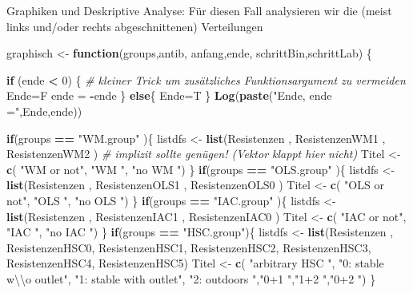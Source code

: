 \documentclass[
]{article}
\newenvironment{Shaded}{\begin{snugshade}}{\end{snugshade}}
\newcommand{\CharTok}[1]{\textcolor[rgb]{0.31,0.60,0.02}{#1}}
\newcommand{\CommentTok}[1]{\textcolor[rgb]{0.56,0.35,0.01}{\textit{#1}}}
\newcommand{\ControlFlowTok}[1]{\textcolor[rgb]{0.13,0.29,0.53}{\textbf{#1}}}
\newcommand{\DecValTok}[1]{\textcolor[rgb]{0.00,0.00,0.81}{#1}}
\newcommand{\KeywordTok}[1]{\textcolor[rgb]{0.13,0.29,0.53}{\textbf{#1}}}
\newcommand{\NormalTok}[1]{#1}
\newcommand{\OperatorTok}[1]{\textcolor[rgb]{0.81,0.36,0.00}{\textbf{#1}}}
\newcommand{\StringTok}[1]{\textcolor[rgb]{0.31,0.60,0.02}{#1}}
\begin{document}
Graphiken und Deskriptive Analyse: Für diesen Fall analysieren wir die
(meist links und/oder rechts abgeschnittenen) Verteilungen

\begin{Shaded}
\begin{Highlighting}[]
\NormalTok{graphisch <-}\StringTok{ }\ControlFlowTok{function}\NormalTok{(groups,antib, anfang,ende, schrittBin,schrittLab) \{    }

  \ControlFlowTok{if}\NormalTok{ (ende }\OperatorTok{<}\StringTok{ }\DecValTok{0}\NormalTok{) \{            }\CommentTok{# kleiner Trick um zusätzliches Funktionsargument zu vermeiden}
\NormalTok{    Ende=F}
\NormalTok{    ende =}\StringTok{ }\OperatorTok{-}\NormalTok{ende}
\NormalTok{  \} }\ControlFlowTok{else}\NormalTok{\{}
\NormalTok{    Ende=T}
\NormalTok{  \}}
  \KeywordTok{Log}\NormalTok{(}\KeywordTok{paste}\NormalTok{(}\StringTok{"Ende, ende ="}\NormalTok{,Ende,ende))}
  
  \ControlFlowTok{if}\NormalTok{(groups }\OperatorTok{==}\StringTok{ "WM.group"}\NormalTok{ )\{}
\NormalTok{    listdfs <-}\StringTok{ }\KeywordTok{list}\NormalTok{(Resistenzen    , ResistenzenWM1 , ResistenzenWM2 )  }\CommentTok{#  implizit sollte genügen! (Vektor klappt hier nicht)}
\NormalTok{    Titel   <-}\StringTok{ }\KeywordTok{c}\NormalTok{(   }\StringTok{"WM or not"}\NormalTok{, }\StringTok{"WM           "}\NormalTok{, }\StringTok{"no WM     "}\NormalTok{)}
\NormalTok{  \}}
   \ControlFlowTok{if}\NormalTok{(groups }\OperatorTok{==}\StringTok{ "OLS.group"}\NormalTok{ )\{}
\NormalTok{    listdfs <-}\StringTok{ }\KeywordTok{list}\NormalTok{(Resistenzen    , ResistenzenOLS1 , ResistenzenOLS0 )  }
\NormalTok{    Titel   <-}\StringTok{ }\KeywordTok{c}\NormalTok{(   }\StringTok{"OLS or not"}\NormalTok{, }\StringTok{"OLS           "}\NormalTok{, }\StringTok{"no OLS      "}\NormalTok{)}
\NormalTok{  \}}
   \ControlFlowTok{if}\NormalTok{(groups }\OperatorTok{==}\StringTok{ "IAC.group"}\NormalTok{ )\{}
\NormalTok{    listdfs <-}\StringTok{ }\KeywordTok{list}\NormalTok{(Resistenzen    , ResistenzenIAC1 , ResistenzenIAC0 ) }
\NormalTok{    Titel   <-}\StringTok{ }\KeywordTok{c}\NormalTok{(   }\StringTok{"IAC or not"}\NormalTok{, }\StringTok{"IAC           "}\NormalTok{, }\StringTok{"no IAC      "}\NormalTok{)}
\NormalTok{  \}}
  \ControlFlowTok{if}\NormalTok{(groups }\OperatorTok{==}\StringTok{ "HSC.group"}\NormalTok{)\{}
\NormalTok{    listdfs <-}\StringTok{ }\KeywordTok{list}\NormalTok{(Resistenzen    , ResistenzenHSC0, ResistenzenHSC1, }
\NormalTok{                    ResistenzenHSC2, ResistenzenHSC3, ResistenzenHSC4, ResistenzenHSC5)  }
\NormalTok{    Titel   <-}\StringTok{ }\KeywordTok{c}\NormalTok{(   }\StringTok{"arbitrary HSC          "}\NormalTok{, }
                    \StringTok{"0: stable w}\CharTok{\textbackslash{}\textbackslash{}}\StringTok{o  outlet"}\NormalTok{, }\StringTok{"1: stable with outlet"}\NormalTok{, }\StringTok{"2: outdoors          "}\NormalTok{,}\StringTok{"0+1                  "}\NormalTok{,}\StringTok{"1+2                  "}\NormalTok{,}\StringTok{"0+2                  "}\NormalTok{)}
\NormalTok{  \}}
  

\end{Highlighting}
\end{Shaded}
\end{document}

